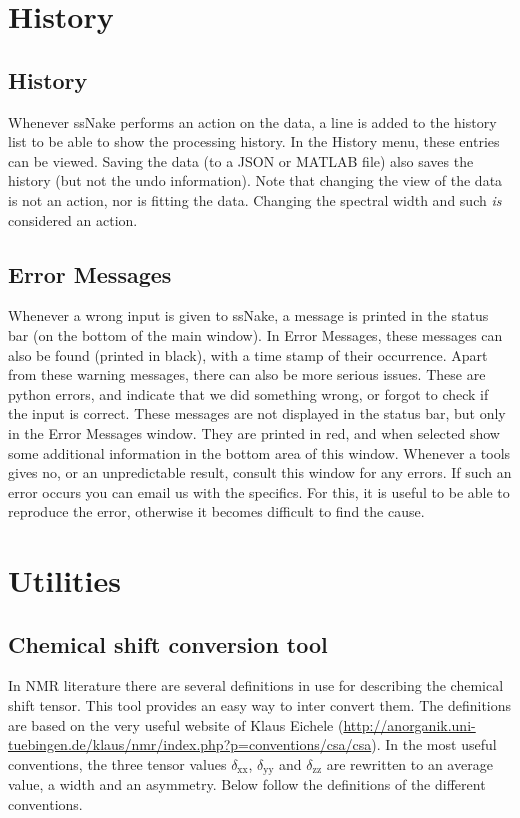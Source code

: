 \documentclass[11pt,a4paper]{article}
\begin{document}
\section{History}
\subsection{History}
Whenever ssNake performs an action on the data, a line is added to the history list to be able to show the processing history. In the History menu, these
entries can be viewed. Saving the data (to a JSON or MATLAB file) also saves the history (but not the undo information). Note that changing the view of the data
is not an action, nor is fitting the data. Changing the spectral width and such \textit{is} considered an action.


\subsection{Error Messages}
Whenever a wrong input is given to ssNake, a message is printed in the status bar (on the bottom of the main window). In Error Messages, these messages
can also be found (printed in black), with a time stamp of their occurrence. Apart from these warning messages, there can also be more serious issues.
These are python errors, and indicate that we did something wrong, or forgot to check if the input is correct. These messages are not displayed in the
status bar, but only in the Error Messages window. They are printed in red, and when selected show some additional information in the bottom area of this window.
Whenever a tools gives no, or an unpredictable result, consult this window for any errors. If such an error occurs you can email us with the specifics.
For this, it is useful to be able to reproduce the error, otherwise it becomes difficult to find the cause.





\section{Utilities}
\subsection{Chemical shift conversion tool}
In NMR literature there are several definitions in use for describing the chemical shift tensor. This tool provides an easy way to inter convert them. The definitions are based on the very useful website of Klaus Eichele (\url{http://anorganik.uni-tuebingen.de/klaus/nmr/index.php?p=conventions/csa/csa}). In the most useful conventions, the three tensor values $\delta_\text{xx}$, $\delta_\text{yy}$ and $\delta_\text{zz}$ are rewritten to an average value, a width and an asymmetry. Below follow the definitions of the different conventions.
\end{document}
